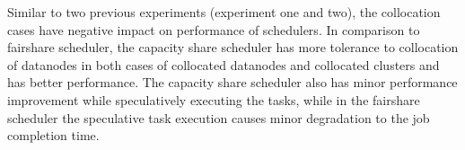 Similar to two previous experiments (experiment one and two), the collocation cases have negative impact on performance of schedulers. In comparison to fairshare scheduler, the capacity share scheduler has more tolerance to collocation of datanodes in both cases of collocated datanodes and collocated clusters and has better performance. The capacity share scheduler also has minor performance improvement while speculatively executing the tasks, while in the fairshare scheduler the speculative task execution causes minor degradation to the job completion time. \\  
 

 



